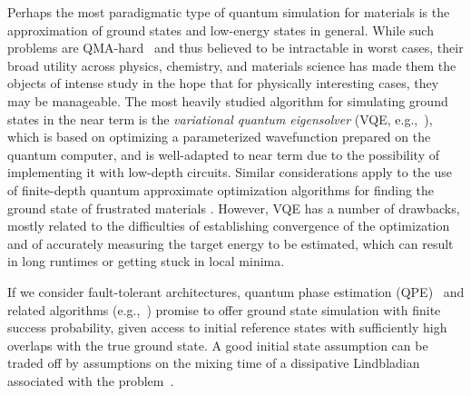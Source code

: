 Perhaps the most paradigmatic type of quantum simulation for materials is the approximation of ground states and low-energy states in general.
While such problems are QMA-hard~\cite{kitaev02,kempekitaevregev04} and thus believed to be intractable in worst cases, their broad utility across physics, chemistry, and materials science has made them the objects of intense study in the hope that for physically interesting cases, they may be manageable.
The most heavily studied algorithm for simulating ground states in the near term is the \emph{variational quantum eigensolver} (VQE, e.g.,~\cite{du2010nmr,lanyon2010towards,peruzzo2014variational,wang2015quantum,omalley2016scalable,shen2017quantum,paesani2017bayesian,kandala2017hardware,hempel2018trappedion,santagati2018witnessing,dumitrescu2018atomicnucleus,kokail2019selfverifying,kandala2019errormitigation,ganzhorn2019gate,sagastizabal2019experimental,mccaskey2019quantum,smart2019quantum,nam2020trappedion,liu2021representation,wang2021resource,liu2023analytic,zheng2023speeding,wang2023ever}), which is based on optimizing a parameterized wavefunction prepared on the quantum computer, and is well-adapted to near term due to the possibility of implementing it with low-depth circuits. Similar considerations apply to the use of finite-depth quantum approximate optimization algorithms for finding the ground state of frustrated materials \cite{doi:10.1073/pnas.2006373117,lotshaw2023simulations}.
However, VQE has a number of drawbacks, mostly related to the difficulties of establishing convergence of the optimization and of accurately measuring the target energy to be estimated, which can result in long runtimes or getting stuck in local minima. 

If we consider fault-tolerant architectures, quantum phase estimation (QPE)~\cite{kitaev1995phaseestimation} and related algorithms (e.g.,~\cite{lin2020nearoptimalground,lin2022heisenberglimited,dong2022groundstate}) promise to offer ground state simulation with finite success probability, given access to initial reference states with sufficiently high overlaps with the true ground state.
A good initial state assumption can be traded off by assumptions on the mixing time of a dissipative Lindbladian associated with the problem~\cite{dingchenlin23}.

